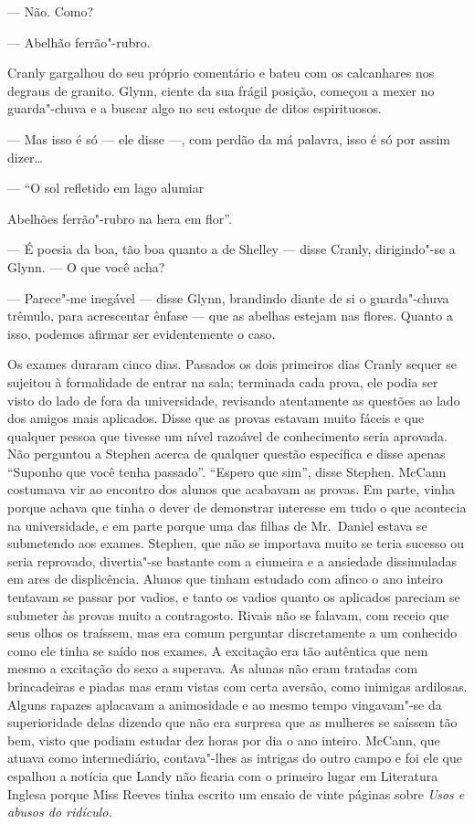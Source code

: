 --- Não.  Como?

--- Abelhão ferrão"-rubro.

Cranly gargalhou do seu próprio comentário e bateu com os calcanhares nos
degraus de granito.  Glynn, ciente da sua frágil posição, começou a mexer no
guarda"-chuva e a buscar algo no seu estoque de ditos espirituosos.

--- Mas isso é só --- ele disse ---, com perdão da má palavra, isso é só por
assim dizer\ldots{}

--- “O sol refletido em lago alumiar

Abelhões ferrão"-rubro na hera em flor”.

--- É poesia da boa, tão boa quanto a de Shelley --- disse Cranly, dirigindo"-se
a Glynn.  --- O que você acha?

--- Parece"-me inegável --- disse Glynn, brandindo diante de si o guarda"-chuva
trêmulo, para acrescentar ênfase --- que as abelhas estejam nas flores.  Quanto
a isso, podemos afirmar ser evidentemente o caso.

Os exames duraram cinco dias.  Passados os dois primeiros dias Cranly sequer se
sujeitou à formalidade de entrar na sala; terminada cada prova, ele podia ser
visto do lado de fora da universidade, revisando atentamente as questões ao
lado dos amigos mais aplicados.  Disse que as provas estavam muito fáceis e que
qualquer pessoa que tivesse um nível razoável de conhecimento seria aprovada.
Não perguntou a Stephen acerca de qualquer questão específica e disse apenas
“Suponho que você tenha passado”.  “Espero que sim”, disse Stephen.  McCann
costumava vir ao encontro dos alunos que acabavam as provas.  Em parte, vinha
porque achava que tinha o dever de demonstrar interesse em tudo o que acontecia
na universidade, e em parte porque uma das filhas de Mr.~Daniel estava se
submetendo aos exames.  Stephen, que não se importava muito se teria sucesso ou
seria reprovado, divertia"-se bastante com a ciumeira e a ansiedade dissimuladas
em ares de displicência.  Alunos que tinham estudado com afinco o ano inteiro
tentavam se passar por vadios, e tanto os vadios quanto os aplicados pareciam
se submeter às provas muito a contragosto.  Rivais não se falavam, com receio
que seus olhos os traíssem, mas era comum perguntar discretamente a um
conhecido como ele tinha se saído nos exames.  A excitação era tão autêntica
que nem mesmo a excitação do sexo a superava.  As alunas não eram tratadas com
brincadeiras e piadas mas eram vistas com certa aversão, como inimigas
ardilosas.  Alguns rapazes aplacavam a animosidade e ao mesmo tempo vingavam"-se
da superioridade delas dizendo que não era surpresa que as mulheres se saíssem
tão bem, visto que podiam estudar dez horas por dia o ano inteiro.
McCann, que atuava como intermediário, contava"-lhes as intrigas do outro campo
e foi ele que espalhou a notícia que Landy não ficaria com o
primeiro lugar em Literatura Inglesa porque Miss Reeves tinha escrito um ensaio
de vinte páginas sobre \textit{Usos e abusos do ridículo.}

